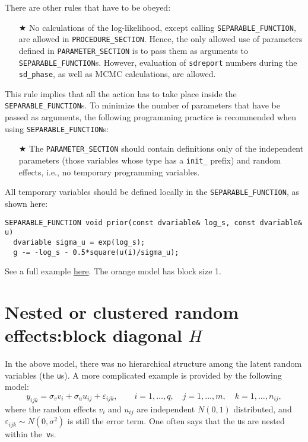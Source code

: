 \documentclass{admbmanual}
\begin{document}
There are other rules that have to be obeyed:
\begin{itemize}
  \item[$\bigstar$] No calculations of the log-likelihood, except calling
  \texttt{SEPARABLE\_FUNCTION}, are allowed in \texttt{PROCEDURE\_SECTION}.
  Hence, the only allowed use of parameters defined in
  \texttt{PARAMETER\_SECTION} is to pass them as arguments to
  \texttt{SEPARABLE\_FUNCTION}s. However, evaluation of \texttt{sdreport}
  numbers during the \texttt{sd\_phase}, as well as MCMC calculations, are
  allowed.
\end{itemize}
This rule implies that all the action has to take place inside the
\texttt{SEPARABLE\_FUNCTION}s. To minimize the number of parameters that have be
passed as arguments, the following programming practice is recommended when
using \texttt{SEPARABLE\_FUNCTION}s:
\begin{itemize}
  \item[$\bigstar$] The \texttt{PARAMETER\_SECTION} should contain definitions
  only of the independent parameters (those variables whose type has a
  \texttt{init\_} prefix) and random effects, i.e., no temporary programming
  variables.
\end{itemize}
All temporary variables should be defined locally in the
\texttt{SEPARABLE\_FUNCTION}, as shown here:
\begin{lstlisting}
SEPARABLE_FUNCTION void prior(const dvariable& log_s, const dvariable& u)
  dvariable sigma_u = exp(log_s);
  g -= -log_s - 0.5*square(u(i)/sigma_u);
\end{lstlisting}

See a full example
\href{http://otter-rsch.com/admbre/examples/orange/orange.html}{here}. The
orange model has block size 1.

\section{Nested or clustered random effects:\br block diagonal $H$}
\label{sec:nested}

In the above model, there was no hierarchical structure among the latent random
variables (the \texttt{u}s). A more complicated example is provided by the
following model:
\[
y_{ijk}= \sigma_v v_i + \sigma_u u_{ij}+\varepsilon_{ijk},
\qquad i=1,\ldots,q,\quad j=1,\ldots,m,\quad k=1,\ldots,n_{ij},
\]
where the random effects $v_i$ and $u_{ij}$ are independent
$N(0,1)$ distributed, and $\varepsilon_{ijk}\sim N(0,\sigma^2)$ is still the
error term. One often says that the \texttt{u}s are nested within
the~\texttt{v}s.
\end{document}
